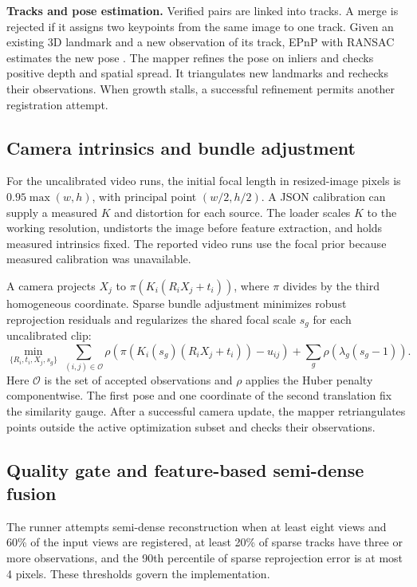 \documentclass[11pt,a4paper]{article}
\begin{document}
\textbf{Tracks and pose estimation.} Verified pairs are linked into tracks.
A merge is rejected if it assigns two keypoints from the same image to one
track. Given an existing 3D landmark and a new observation of its track,
EPnP with RANSAC estimates the new pose \cite{epnp}. The mapper refines the
pose on inliers and checks positive depth and spatial spread. It triangulates
new landmarks and rechecks their observations. When growth stalls, a
successful refinement permits another registration attempt.

\subsection{Camera intrinsics and bundle adjustment}
For the uncalibrated video runs, the initial focal length in resized-image
pixels is \(0.95\max(w,h)\), with principal point \((w/2,h/2)\). A JSON calibration
can supply a measured \(K\) and distortion for each source. The loader scales
\(K\) to the working resolution, undistorts the image before feature
extraction, and holds measured intrinsics fixed. The reported video runs use
the focal prior because measured calibration was unavailable.

A camera projects \(X_j\) to \(\pi(K_i(R_iX_j+t_i))\), where \(\pi\) divides by
the third homogeneous coordinate. Sparse bundle adjustment \cite{triggs}
minimizes robust reprojection residuals and regularizes the shared focal
scale \(s_g\) for each uncalibrated clip:
\[
\min_{\{R_i,t_i,X_j,s_g\}}\ 
\sum_{(i,j)\in\mathcal{O}}
 \rho\!\left(\pi\!\left(K_i(s_g)(R_iX_j+t_i)\right)-u_{ij}\right)
 + \sum_g \rho\!\left(\lambda_g(s_g-1)\right).
\]
Here \(\mathcal{O}\) is the set of accepted observations and \(\rho\) applies
the Huber penalty componentwise. The first pose and one coordinate of the
second translation fix the similarity gauge. After a successful camera
update, the mapper retriangulates points outside the active optimization
subset and checks their observations.

\clearpage
\subsection{Quality gate and feature-based semi-dense fusion}
The runner attempts semi-dense reconstruction when at least eight views and
60\% of the input views are registered, at least 20\% of sparse tracks have
three or more observations, and the 90th percentile of sparse reprojection
error is at most 4 pixels. These thresholds govern the implementation.
\end{document}
